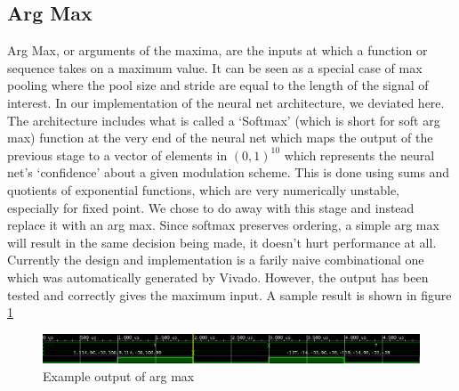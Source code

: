 \subsection{Arg Max}
Arg Max, or arguments of the maxima, are the inputs at which a function or sequence takes on a maximum value.  It can be seen as a special case of max pooling where the pool size and stride are equal to the length of the signal of interest.  In our implementation of the neural net architecture, we deviated here.  The architecture includes what is called a `Softmax' (which is short for soft arg max) function at the very end of the neural net which maps the output of the previous stage to a vector of elements in $(0,1)^{10}$ which represents the neural net's `confidence' about a given modulation scheme.  This is done using sums and quotients of exponential functions, which are very numerically unstable, especially for fixed point.  We chose to do away with this stage and instead replace it with an arg max.  Since softmax preserves ordering, a simple arg max will result in the same decision being made, it doesn't hurt performance at all.  Currently the design and implementation is a farily naive combinational one which was automatically generated by Vivado.  However, the output has been tested and correctly gives the maximum input.  A sample result is shown in figure \ref{fig:argmax}

\begin{figure}[H]
\includegraphics[width=\textwidth]{argmax.png}
\caption{Example output of arg max}
\label{fig:argmax}
\centering
\end{figure}
